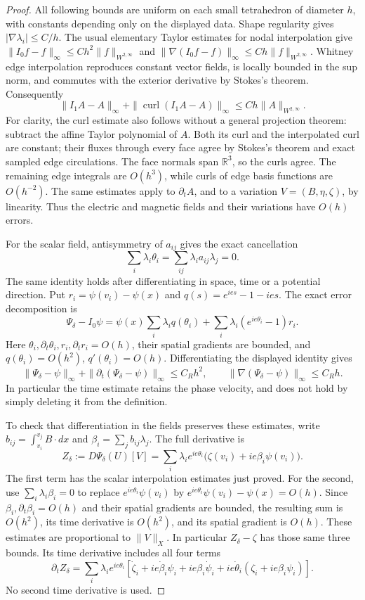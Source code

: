 \begin{proof}
All following bounds are uniform on each small tetrahedron of diameter
\(h\), with constants depending only on the displayed data. Shape regularity
gives \(|\nabla\lambda_i|\leq C/h\). The usual elementary Taylor
estimates for nodal interpolation give
\(\|I_0f-f\|_\infty\leq Ch^2\|f\|_{W^{2,\infty}}\) and
\(\|\nabla(I_0f-f)\|_\infty\leq Ch\|f\|_{W^{2,\infty}}\).
Whitney edge interpolation reproduces constant vector fields, is locally
bounded in the sup norm, and commutes with the exterior derivative by
Stokes's theorem. Consequently
\[
 \|I_1A-A\|_\infty+
 \|\operatorname{curl}(I_1A-A)\|_\infty
 \leq Ch\|A\|_{W^{2,\infty}}.
\]
For clarity, the curl estimate also follows without a general projection
theorem: subtract the affine Taylor polynomial of \(A\). Both its curl
and the interpolated curl are constant; their fluxes through every face
agree by Stokes's theorem and exact sampled edge circulations. The face
normals span \(\mathbb R^3\), so the curls agree. The remaining edge
integrals are \(O(h^3)\), while curls of edge basis functions are
\(O(h^{-2})\). The same estimates apply to \(\partial_tA\), and
to a variation \(V=(B,\eta,\zeta)\), by linearity. Thus the electric
and magnetic fields and their variations have \(O(h)\) errors.

For the scalar field, antisymmetry of \(a_{ij}\) gives the exact
cancellation
\[
 \sum_i\lambda_i\theta_i=\sum_{ij}\lambda_i a_{ij}\lambda_j=0.
\]
The same identity holds after differentiating in space, time or a potential
direction. Put \(r_i=\psi(v_i)-\psi(x)\) and
\(q(s)=e^{ies}-1-ies\). The exact error decomposition is
\[
 \Psi_\delta-I_0\psi
 =\psi(x)\sum_i\lambda_i q(\theta_i)
   +\sum_i\lambda_i(e^{ie\theta_i}-1)r_i.
\]
Here \(\theta_i,\partial_t\theta_i,r_i,\partial_tr_i=O(h)\),
their spatial gradients are bounded, and
\(q(\theta_i)=O(h^2)\), \(q'(\theta_i)=O(h)\).
Differentiating the displayed identity gives
\[
 \|\Psi_\delta-\psi\|_\infty+
 \|\partial_t(\Psi_\delta-\psi)\|_\infty\leq C_Rh^2,
 \qquad
 \|\nabla(\Psi_\delta-\psi)\|_\infty\leq C_Rh.
\]
In particular the time estimate retains the phase velocity, and does not
hold by simply deleting it from the definition.

To check that differentiation in the fields preserves these estimates,
write \(b_{ij}=\int_{v_i}^{v_j}B\cdot dx\) and
\(\beta_i=\sum_j b_{ij}\lambda_j\). The full derivative is
\[
 Z_\delta:=D\Psi_\delta(U)[V]
 =\sum_i\lambda_i e^{ie\theta_i}
       \bigl(\zeta(v_i)+ie\beta_i\psi(v_i)\bigr).
\]
The first term has the scalar interpolation estimates just proved.
For the second, use \(\sum_i\lambda_i\beta_i=0\) to replace
\(e^{ie\theta_i}\psi(v_i)\) by
\(e^{ie\theta_i}\psi(v_i)-\psi(x)=O(h)\).
Since \(\beta_i,\partial_t\beta_i=O(h)\) and their spatial
gradients are bounded, the resulting sum is \(O(h^2)\), its time
derivative is \(O(h^2)\), and its spatial gradient is \(O(h)\).
These estimates are proportional to \(\|V\|_X\). In particular
\(Z_\delta-\zeta\) has those same three bounds. Its time derivative
includes all four terms
\[
 \partial_tZ_\delta=\sum_i\lambda_i e^{ie\theta_i}
 \left[\dot\zeta_i+ie\dot\beta_i\psi_i+ie\beta_i\dot\psi_i
       +ie\dot\theta_i(\zeta_i+ie\beta_i\psi_i)\right].
\]
No second time derivative is used.


\end{proof}
